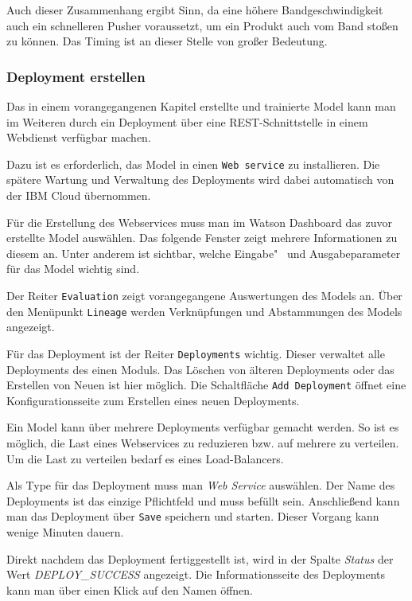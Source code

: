 Auch dieser Zusammenhang ergibt Sinn, da eine höhere Bandgeschwindigkeit auch ein schnelleren Pusher voraussetzt, um ein
Produkt auch vom Band stoßen zu können. Das Timing ist an dieser Stelle von großer Bedeutung.

\subsubsection{Deployment erstellen}
\label{subsec:deployment_erstellen}
Das in einem vorangegangenen Kapitel erstellte und trainierte Model kann man im Weiteren durch ein Deployment über eine
REST-Schnittstelle in einem Webdienst verfügbar machen.

Dazu ist es erforderlich, das Model in einen \texttt{Web service} zu installieren. Die spätere Wartung und Verwaltung
des Deployments wird dabei automatisch von der IBM Cloud übernommen.

Für die Erstellung des Webservices muss man im Watson Dashboard das zuvor erstellte Model auswählen. Das folgende
Fenster zeigt mehrere Informationen zu diesem an. Unter anderem ist sichtbar, welche Eingabe"~ und Ausgabeparameter für
das Model wichtig sind.

Der Reiter \texttt{Evaluation} zeigt vorangegangene Auswertungen des Models an. Über den Menüpunkt \texttt{Lineage}
werden Verknüpfungen und Abstammungen des Models angezeigt.

Für das Deployment ist der Reiter \texttt{Deployments} wichtig. Dieser verwaltet alle Deployments des einen Moduls. Das
Löschen von älteren Deployments oder das Erstellen von Neuen ist hier möglich. Die Schaltfläche \texttt{Add Deployment}
öffnet eine Konfigurationsseite zum Erstellen eines neuen Deployments.

Ein Model kann über mehrere Deployments verfügbar gemacht werden. So ist es möglich, die Last eines Webservices zu
reduzieren bzw. auf mehrere zu verteilen. Um die Last zu verteilen bedarf es eines Load-Balancers.

Als Type für das Deployment muss man \textit{Web Service} auswählen. Der Name des Deployments ist das einzige Pflichtfeld
und muss befüllt sein. Anschließend kann man das Deployment über \texttt{Save} speichern und starten. Dieser Vorgang kann
wenige Minuten dauern.

Direkt nachdem das Deployment fertiggestellt ist, wird in der Spalte \textit{Status} der Wert \textit{DEPLOY\_SUCCESS}
angezeigt. Die Informationsseite des Deployments kann man über einen Klick auf den Namen öffnen.

